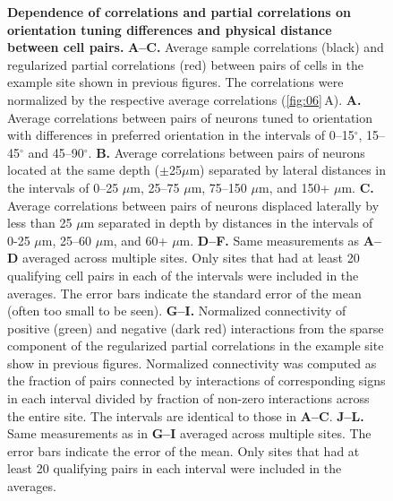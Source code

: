 \documentclass[10pt]{article}
\begin{document}
\begin{figure}[!ht]
    \begin{center}
    \end{center}
    \caption{{\bf Dependence of correlations and partial correlations on orientation tuning differences and physical distance between cell pairs.}
    {\bf A--C.} Average sample correlations (black) and regularized partial correlations (red) between pairs of cells in the example site shown in previous figures. The correlations were normalized by the respective average correlations (\ref{fig:06}\,A).
    {\bf A.} Average correlations between pairs of neurons tuned to orientation with differences in preferred orientation in the intervals of 0--15$^\circ$, 15--45$^\circ$ and 45--90$^\circ$. 
    {\bf B.} Average correlations between pairs of neurons located at the same depth ($\pm$25$\mu$m) separated by lateral distances in the intervals of 0--25 $\mu$m, 25--75 $\mu$m, 75--150 $\mu$m, and 150+ $\mu$m.
    {\bf C.} Average correlations between pairs of neurons displaced laterally by less than 25 $\mu$m separated in depth by distances in the intervals of 0-25 $\mu$m, 25--60 $\mu$m, and 60+ $\mu$m.
    {\bf D--F.} Same measurements as {\bf A--D} averaged across multiple sites. Only sites that had at least 20 qualifying cell pairs in each of the intervals were included in the averages. The error bars indicate the standard error of the mean (often too small to be seen).
    {\bf G--I.} Normalized connectivity of positive (green) and negative (dark red) interactions from the sparse component of the regularized partial correlations in the example site show in previous figures. Normalized connectivity was computed as the fraction of pairs connected by interactions of corresponding signs in each interval divided by fraction of non-zero interactions across the entire site. The intervals are identical to those in {\bf A--C}.
    {\bf J--L.} Same measurements as in {\bf G--I} averaged across multiple sites. The error bars indicate the error of the mean. Only sites that had at least 20 qualifying pairs in each interval were included in the averages. 
}
\label{fig:07}
\end{figure}
\end{document}
